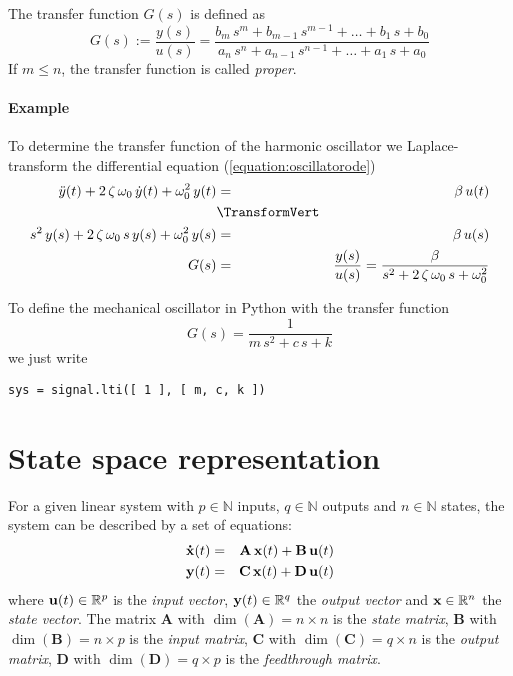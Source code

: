 \documentclass[a4paper,12pt]{article}
\renewcommand{\Vec}[1]{{\bf #1}}
\newcommand{\Mat}[1]{\mathbf{#1}}
\newcommand{\Section}[2]{\section{#2}\label{section:#1}}
\newcommand{\ERef}[1]{(\ref{equation:#1})}
\begin{document}
The transfer function $G(s)$ is defined as
\begin{equation}
G(s):=\frac{y(s)}{u(s)}=\frac{b_{m}\,s^{m}+b_{m-1}\,s^{m-1}+\ldots+b_{1}\,s+b_{0}}{a_{n}\,s^{n}+a_{n-1}\,s^{n-1}+\ldots+a_{1}\,s+a_{0}}
\end{equation}
If $m\leq n$, the transfer function is called {\em proper}.\\

\paragraph{Example}

To determine the transfer function of the harmonic oscillator we
Laplace-transform the differential equation \ERef{oscillatorode}
\begin{eqnarray}
\ddot{y}(t)+2\,\zeta\,\omega_0\,\dot{y}(t)+\omega_0^2\,y(t)&=&\beta\,u(t)\\
&\TransformVert&\nonumber\\
s^2\,y(s)+2\,\zeta\,\omega_0\,s\,y(s)+\omega_0^2\,y(s)&=&\beta\,u(s)\\
G(s)&=&\frac{y(s)}{u(s)}=\frac{\beta}{s^2+2\,\zeta\,\omega_0\,s+\omega_0^2}
\end{eqnarray}

To define the mechanical oscillator in Python with the transfer function
\begin{equation}
G(s)=\frac{1}{m\,s^2+c\,s+k}
\end{equation}
we just write
\begin{verbatim}
sys = signal.lti([ 1 ], [ m, c, k ])
\end{verbatim}

\Section{sspace}{State space representation}

For a given linear system with $p\in\mathbb{N}$ inputs, $q\in\mathbb{N}$
outputs and $n\in\mathbb{N}$ states, the system can be described by a set
of equations:
\begin{eqnarray}
\Vec{\dot{x}}(t)&=&\Mat{A}\,\Vec{x}(t)+\Mat{B}\,\Vec{u}(t)\\
\Vec{y}(t)&=&\Mat{C}\,\Vec{x}(t)+\Mat{D}\,\Vec{u}(t)
\end{eqnarray}
where $\Vec{u}(t)\in\mathbb{R}^p$ is the {\em input vector},
$\Vec{y}(t)\in\mathbb{R}^q$ the {\em output vector} and $\Vec{x}\in\mathbb{R}^n$
the {\em state vector}. The matrix $\Mat{A}$ with $\dim(\Mat{A})=n\times n$ is
the {\em state matrix}, $\Mat{B}$ with $\dim(\Mat{B})=n\times p$ is the
{\em input matrix}, $\Mat{C}$ with $\dim(\Mat{C})=q\times n$ is the
{\em output matrix}, $\Mat{D}$ with $\dim(\Mat{D})=q\times p$ is the
{\em feedthrough matrix}.\\
\end{document}
